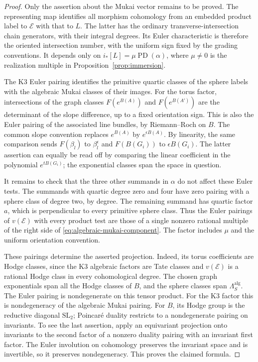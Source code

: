 \documentclass[11pt]{article}
\numberwithin{equation}{section}
\theoremstyle{definition}
\theoremstyle{remark}
\begin{document}
\begin{proof}
Only the assertion about the Mukai vector remains to be proved.
The representing map identifies all morphism cohomology from an
embedded product label to $\mathcal E$ with that to $L$.
The latter has the ordinary transverse-intersection chain generators,
with their integral degrees.  Its Euler characteristic is therefore
the oriented intersection number, with the uniform sign fixed by
the grading conventions.  It depends only on
$i_*[L]=\mu\operatorname{PD}(\alpha)$, where $\mu\ne0$ is the realization
multiple in Proposition~\ref{prop:immersion}.

The K3 Euler pairing identifies the primitive quartic classes of the
sphere labels with the algebraic Mukai classes of their images.
For the torus factor, intersections of the graph classes
$F(e^{B(A)})$ and $F(e^{B(A')})$ are the determinant of the slope
difference, up to a fixed orientation sign.  This is also the Euler
pairing of the associated line bundles, by Riemann--Roch on $B$.
The common slope convention replaces $e^{B(A)}$ by
$e^{\epsilon B(A)}$.  By linearity, the same comparison sends
$F(\beta_l)$ to $\beta_l^\epsilon$ and $F(B(G_i))$ to
$\epsilon B(G_i)$.  The latter assertion can equally be read off by
comparing the linear coefficient in the polynomial
$e^{tB(G_i)}$; the exponential classes span the space in question.

It remains to check that the three other summands in $\alpha$ do not
affect these Euler tests.  The summands with quartic degree zero and
four have zero pairing with a sphere class of degree two, by degree.
The remaining summand has quartic factor $a$, which is perpendicular
to every primitive sphere class.  Thus the Euler pairings of
$v(\mathcal E)$ with every product test are those of a single nonzero
rational multiple of the right side of
\eqref{eq:algebraic-mukai-component}.  The factor includes $\mu$ and
the uniform orientation convention.

These pairings determine the asserted projection.  Indeed, its torus
coefficients are Hodge classes, since the K3 algebraic factors are
Tate classes and $v(\mathcal E)$ is a rational Hodge class in every
cohomological degree.  The chosen graph exponentials span all the
Hodge classes of $B$, and the sphere classes span
$\Lambda_S^{\mathrm{alg}}$.  The Euler pairing is nondegenerate on
this tensor product.  For the K3 factor this is nondegeneracy of the
algebraic Mukai pairing.  For $B$, its Hodge group is the reductive
diagonal $\mathrm{SL}_2$; Poincar\'e duality restricts to a
nondegenerate pairing on invariants.  To see the last assertion,
apply an equivariant projection onto invariants to the second factor
of a nonzero duality pairing with an invariant first factor.
The Euler involution on cohomology preserves the invariant space
and is invertible, so it preserves nondegeneracy.
This proves the claimed formula.
\end{proof}
\end{document}
